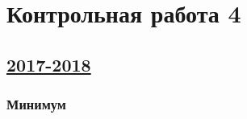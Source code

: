 \newpage
\thispagestyle{empty}
\section{Контрольная работа 4}



\subsection[2017-2018]{\hyperref[sec:sol_kr_04_2017_2018]{2017-2018}}
\label{sec:kr_04_2017_2018}



\subsubsection*{Минимум}

